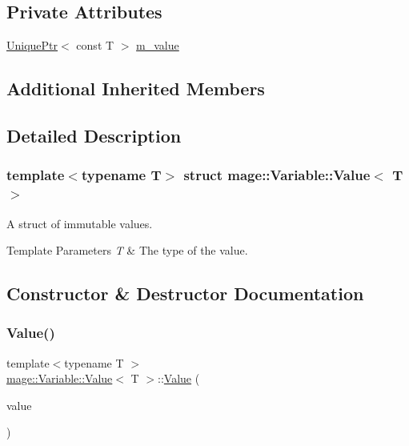 \subsection*{Private Attributes}
\begin{DoxyCompactItemize}
\item 
\hyperlink{namespacemage_a8c307fbcc33bce9b7f2aa4c26c3b95cf}{Unique\+Ptr}$<$ const T $>$ \hyperlink{structmage_1_1_variable_1_1_value_ae034b2263375fdcfdba4f0cfdb3cd014}{m\+\_\+value}
\end{DoxyCompactItemize}
\subsection*{Additional Inherited Members}


\subsection{Detailed Description}
\subsubsection*{template$<$typename T$>$\newline
struct mage\+::\+Variable\+::\+Value$<$ T $>$}

A struct of immutable values. 
\begin{DoxyTemplParams}{Template Parameters}
{\em T} & The type of the value. \\
\hline
\end{DoxyTemplParams}


\subsection{Constructor \& Destructor Documentation}
\hypertarget{structmage_1_1_variable_1_1_value_a1e29cc5eaeb8356a11a1eca0232cf162}{}\label{structmage_1_1_variable_1_1_value_a1e29cc5eaeb8356a11a1eca0232cf162} 
\subsubsection{\texorpdfstring{Value()}{Value()}\hspace{0.1cm}{\footnotesize\ttfamily [1/3]}}
{\footnotesize\ttfamily template$<$typename T $>$ \\
\hyperlink{structmage_1_1_variable_1_1_value}{mage\+::\+Variable\+::\+Value}$<$ T $>$\+::\hyperlink{structmage_1_1_variable_1_1_value}{Value} (\begin{DoxyParamCaption}\item[{const T $\ast$}]{value }\end{DoxyParamCaption})}

